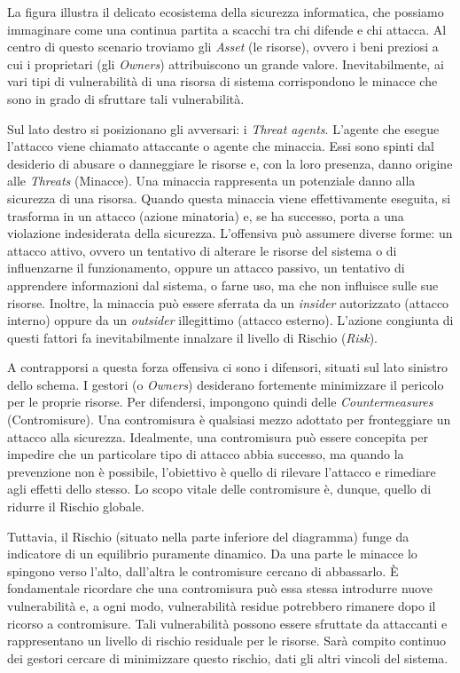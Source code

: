 La figura illustra il delicato ecosistema della sicurezza informatica, che possiamo immaginare come una continua partita a scacchi tra chi difende e chi attacca. Al centro di questo scenario troviamo gli \textit{Asset} (le risorse), ovvero i beni preziosi a cui i proprietari (gli \textit{Owners}) attribuiscono un grande valore. Inevitabilmente, ai vari tipi di vulnerabilità di una risorsa di sistema corrispondono le minacce che sono in grado di sfruttare tali vulnerabilità.

Sul lato destro si posizionano gli avversari: i \textit{Threat agents}. L'agente che esegue l'attacco viene chiamato attaccante o agente che minaccia. Essi sono spinti dal desiderio di abusare o danneggiare le risorse e, con la loro presenza, danno origine alle \textit{Threats} (Minacce). Una minaccia rappresenta un potenziale danno alla sicurezza di una risorsa. Quando questa minaccia viene effettivamente eseguita, si trasforma in un attacco (azione minatoria) e, se ha successo, porta a una violazione indesiderata della sicurezza. L'offensiva può assumere diverse forme: un attacco attivo, ovvero un tentativo di alterare le risorse del sistema o di influenzarne il funzionamento, oppure un attacco passivo, un tentativo di apprendere informazioni dal sistema, o farne uso, ma che non influisce sulle sue risorse. Inoltre, la minaccia può essere sferrata da un \textit{insider} autorizzato (attacco interno) oppure da un \textit{outsider} illegittimo (attacco esterno). L'azione congiunta di questi fattori fa inevitabilmente innalzare il livello di Rischio (\textit{Risk}).

A contrapporsi a questa forza offensiva ci sono i difensori, situati sul lato sinistro dello schema. I gestori (o \textit{Owners}) desiderano fortemente minimizzare il pericolo per le proprie risorse. Per difendersi, impongono quindi delle \textit{Countermeasures} (Contromisure). Una contromisura è qualsiasi mezzo adottato per fronteggiare un attacco alla sicurezza. Idealmente, una contromisura può essere concepita per impedire che un particolare tipo di attacco abbia successo, ma quando la prevenzione non è possibile, l'obiettivo è quello di rilevare l'attacco e rimediare agli effetti dello stesso. Lo scopo vitale delle contromisure è, dunque, quello di ridurre il Rischio globale.

Tuttavia, il Rischio (situato nella parte inferiore del diagramma) funge da indicatore di un equilibrio puramente dinamico. Da una parte le minacce lo spingono verso l'alto, dall'altra le contromisure cercano di abbassarlo. È fondamentale ricordare che una contromisura può essa stessa introdurre nuove vulnerabilità e, a ogni modo, vulnerabilità residue potrebbero rimanere dopo il ricorso a contromisure. Tali vulnerabilità possono essere sfruttate da attaccanti e rappresentano un livello di rischio residuale per le risorse. Sarà compito continuo dei gestori cercare di minimizzare questo rischio, dati gli altri vincoli del sistema.